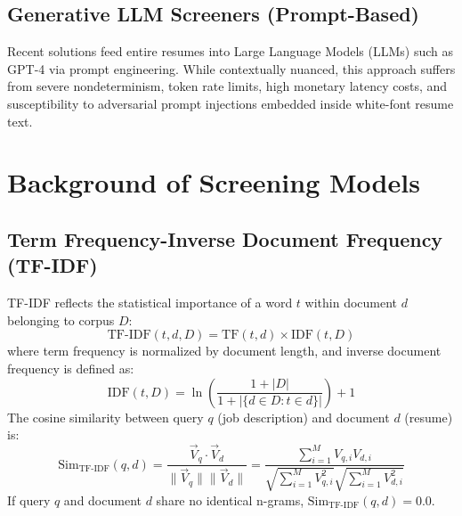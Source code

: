 \documentclass[12pt,a4paper]{report}
\begin{document}
\subsection{Generative LLM Screeners (Prompt-Based)}
Recent solutions feed entire resumes into Large Language Models (LLMs) such as GPT-4 via prompt engineering. While contextually nuanced, this approach suffers from severe nondeterminism, token rate limits, high monetary latency costs, and susceptibility to adversarial prompt injections embedded inside white-font resume text.

\section{Background of Screening Models}

\subsection{Term Frequency-Inverse Document Frequency (TF-IDF)}
TF-IDF reflects the statistical importance of a word $t$ within document $d$ belonging to corpus $D$:
\begin{equation}
\text{TF-IDF}(t, d, D) = \text{TF}(t, d) \times \text{IDF}(t, D)
\end{equation}
where term frequency is normalized by document length, and inverse document frequency is defined as:
\begin{equation}
\text{IDF}(t, D) = \ln \left( \frac{1 + |D|}{1 + |\{d \in D : t \in d\}|} \right) + 1
\end{equation}
The cosine similarity between query $q$ (job description) and document $d$ (resume) is:
\begin{equation}
\text{Sim}_{\text{TF-IDF}}(q, d) = \frac{\vec{V}_q \cdot \vec{V}_d}{\|\vec{V}_q\| \|\vec{V}_d\|} = \frac{\sum_{i=1}^M V_{q,i} V_{d,i}}{\sqrt{\sum_{i=1}^M V_{q,i}^2} \sqrt{\sum_{i=1}^M V_{d,i}^2}}
\end{equation}
If query $q$ and document $d$ share no identical n-grams, $\text{Sim}_{\text{TF-IDF}}(q, d) = 0.0$.
\end{document}
